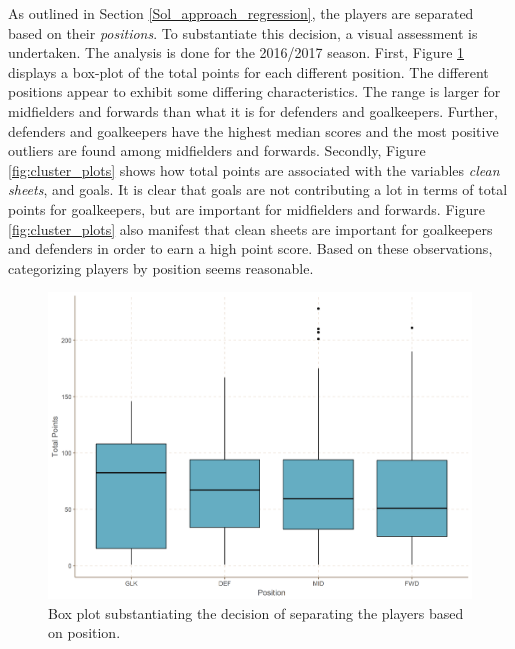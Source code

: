 As outlined in Section \ref{Sol_approach_regression}, the players are separated based on their \textit{positions}. To substantiate this decision, a visual assessment is undertaken. The analysis is done for the 2016/2017 season. First, Figure \ref{fig:box_plots} displays a box-plot of the total points for each different position. The different positions appear to exhibit some differing characteristics. The range is larger for midfielders and forwards than what it is for defenders and goalkeepers. Further, defenders and goalkeepers have the highest median scores and the most positive outliers are found among midfielders and forwards. Secondly, Figure \ref{fig:cluster_plots} shows how total points are associated with the variables \textit{clean sheets}, and goals. It is clear that goals are not contributing a lot in terms of total points for goalkeepers, but are important for midfielders and forwards. Figure \ref{fig:cluster_plots} also manifest that clean sheets are important for goalkeepers and defenders in order to earn a high point score. Based on these observations, categorizing players by position seems reasonable.

\begin{figure}[H]
    \centering
    \includegraphics[scale=0.45]{fig/chapter_6/box_plots.png}
    \caption{Box plot substantiating the decision of separating the players based on position.}
\label{fig:box_plots}    
\end{figure}


